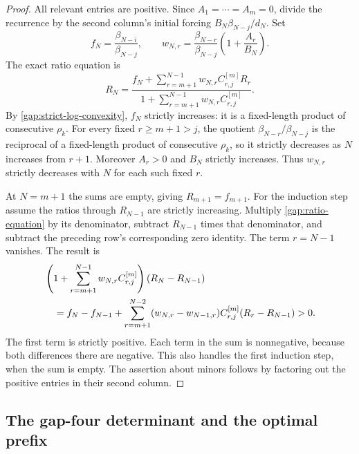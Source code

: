 \begin{proof}
All relevant entries are positive. Since $A_1=\cdots=A_m=0$,
divide the recurrence by the second column's initial forcing
$B_N\beta_{N-j}/d_N$. Set
\begin{equation}\label{gap:normalized-weights}
 f_N=\frac{\beta_{N-i}}{\beta_{N-j}},\qquad
 w_{N,r}=\frac{\beta_{N-r}}{\beta_{N-j}}
                    \left(1+\frac{A_r}{B_N}\right).
\end{equation}
The exact ratio equation is
\begin{equation}\label{gap:ratio-equation}
 R_N=
 \frac{f_N+\displaystyle\sum_{r=m+1}^{N-1}
                   w_{N,r}C_{r,j}^{[m]}R_r}
      {1+\displaystyle\sum_{r=m+1}^{N-1}
                   w_{N,r}C_{r,j}^{[m]}}.
\end{equation}
By \eqref{gap:strict-log-convexity}, $f_N$ strictly increases: it is
a fixed-length product of consecutive $\rho_k$. For every fixed
$r\ge m+1>j$, the quotient $\beta_{N-r}/\beta_{N-j}$ is the
reciprocal of a fixed-length product of consecutive $\rho_k$,
so it strictly decreases as $N$ increases from $r+1$. Moreover
$A_r>0$ and $B_N$ strictly increases. Thus $w_{N,r}$ strictly
decreases with $N$ for each such fixed $r$.

At $N=m+1$ the sums are empty, giving $R_{m+1}=f_{m+1}$.
For the induction step assume the ratios through $R_{N-1}$ are
strictly increasing. Multiply \eqref{gap:ratio-equation} by its
denominator, subtract $R_{N-1}$ times that denominator, and subtract
the preceding row's corresponding zero identity. The term $r=N-1$
vanishes. The result is
\begin{align}
 &\left(1+\sum_{r=m+1}^{N-1}w_{N,r}C_{r,j}^{[m]}\right)
                 (R_N-R_{N-1})\notag\\
 &\quad=f_N-f_{N-1}
  +\sum_{r=m+1}^{N-2}(w_{N,r}-w_{N-1,r})C_{r,j}^{[m]}
                              (R_r-R_{N-1})>0.
 \label{gap:ratio-increment}
\end{align}
The first term is strictly positive. Each term in the sum is
nonnegative, because both differences there are negative. This
also handles the first induction step, when the sum is empty.
The assertion about minors follows by factoring out the positive
entries in their second column.
\end{proof}

\subsection{The gap-four determinant and the optimal prefix}

